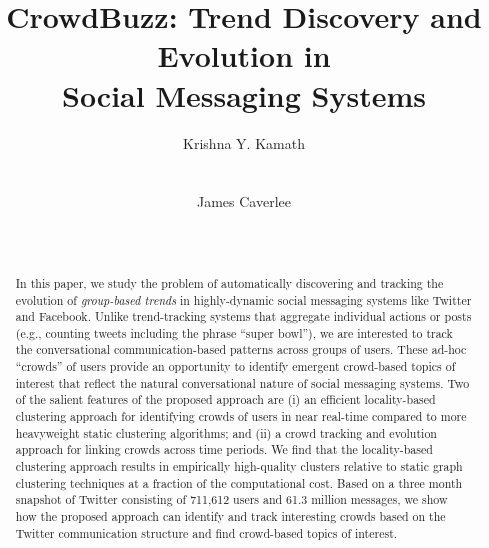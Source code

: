 \documentclass{sig-alternate}
\begin{document}
\title{CrowdBuzz: Trend Discovery and Evolution in \\Social Messaging Systems}

\author{
\alignauthor Krishna Y. Kamath\\
       \\
       \\
\alignauthor James Caverlee\\
       \\
       \\
}

\maketitle
\begin{abstract}
In this paper, we study the problem of automatically discovering and tracking the evolution of \textit{group-based trends} in highly-dynamic social messaging systems like Twitter and Facebook. Unlike trend-tracking systems that aggregate individual actions or posts (e.g., counting tweets including the phrase ``super bowl''), we are interested to track the conversational communication-based patterns across groups of users. These ad-hoc ``crowds'' of users provide an opportunity to identify emergent crowd-based topics of interest that reflect the natural conversational nature of social messaging systems. Two of the salient features of the proposed approach are (i) an efficient locality-based clustering approach for identifying crowds of users in near real-time compared to more heavyweight static clustering algorithms; and (ii) a crowd tracking and evolution approach for linking crowds across time periods. We find that the locality-based clustering approach results in empirically high-quality clusters relative to static graph clustering techniques at a
fraction of the computational cost. Based on a three month snapshot of Twitter consisting of
 711,612 users and 61.3 million messages, we show how the proposed approach can
identify and track interesting crowds based on the Twitter communication structure and find crowd-based topics of interest.

\end{abstract}
\end{document}
